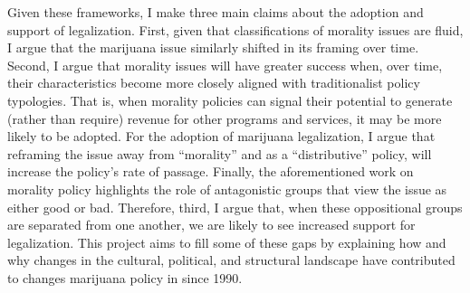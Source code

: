 Given these frameworks, I make three main claims about the adoption and support of legalization. First, given that classifications of morality issues are fluid, I argue that the marijuana issue similarly shifted in its framing over time. Second, I argue that morality issues will have greater success when, over time, their characteristics become more closely aligned with traditionalist policy typologies. That is, when morality policies can signal their potential to generate (rather than require) revenue for other programs and services, it may be more likely to be adopted. For the adoption of marijuana legalization, I argue that reframing the issue away from ``morality'' and as a ``distributive'' policy, will increase the policy's rate of passage. Finally, the aforementioned work on morality policy highlights the role of antagonistic groups that view the issue as either good or bad. Therefore, third, I argue that, when these oppositional groups are separated from one another, we are likely to see increased support for legalization.
This project aims to fill some of these gaps by explaining how and why changes in the cultural, political, and structural landscape have contributed to changes marijuana policy in since 1990.







